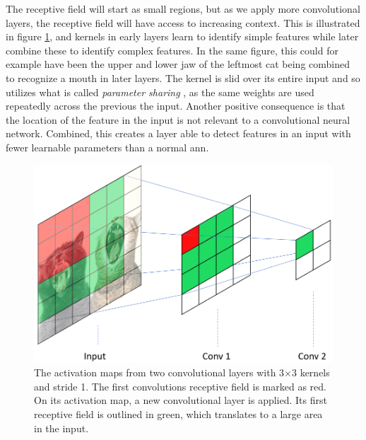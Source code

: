     The receptive field will start as small regions, but as we apply more convolutional layers, the receptive field will have access to increasing context\cite{o2015introduction_convolutions}. This is illustrated in figure \ref{receptive_field_fig}, and kernels in early layers learn to identify simple features while later combine these to identify complex features. In the same figure, this could for example have been the upper and lower jaw of the leftmost cat being combined to recognize a mouth in later layers. The kernel is slid over its entire input and so utilizes what is called \textit{parameter sharing }, as the same weights are used repeatedly across the previous the input. Another positive consequence is that the location of the feature in the input is not relevant to a convolutional neural network. Combined, this creates a layer able to detect features in an input with fewer learnable parameters than a normal \gls{ann}. 
    
    \begin{figure}[H]
        \centering
        \includegraphics[scale=0.4]{figures/receptive_field.png}
        \caption[Receptive field]{The activation maps from two convolutional layers with 3×3 kernels and stride 1. The first convolutions receptive field is marked as red. On its activation map, a new convolutional layer is applied. Its first receptive field is outlined in green, which translates to a large area in the input.}
      	\medskip 
        \label{receptive_field_fig}
    \end{figure}

